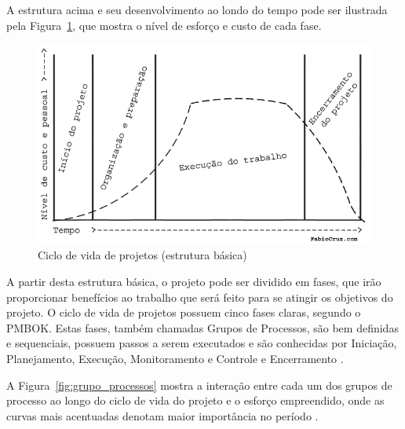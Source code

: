\documentclass[
    12pt,               %
    openright,          %
    twoside,            %
    a4paper,            %
    chapter=TITLE,     %
    english,            %
    spanish,            %
    portuguese              %
    ]{abntex2}
\begin{document}
A estrutura acima e seu desenvolvimento ao londo do tempo pode ser ilustrada pela Figura~\ref{fig:ciclo_vida_projeto}, que mostra o nível de esforço e custo de cada fase.

\begin{figure}[htb]
\RawFloats
	\caption{\label{fig:ciclo_vida_projeto}Ciclo de vida de projetos (estrutura básica)}
	\begin{center}
	    \includegraphics[scale=0.50]{figuras/ciclo_vida_projeto.png}
	\end{center}
\end{figure}

A partir desta estrutura básica, o projeto pode ser dividido em fases, que irão proporcionar benefícios ao trabalho que será feito para se atingir os objetivos do projeto. O ciclo de vida de projetos possuem cinco fases claras, segundo o PMBOK. Estas fases, também chamadas Grupos de Processos, são bem definidas e sequenciais, possuem passos a serem executados e são conhecidas por Iniciação, Planejamento, Execução, Monitoramento e Controle e Encerramento \cite[p.~14]{Cruz2013}. 

A Figura~\ref{fig:grupo_processos} mostra a interação entre cada um dos grupos de processo ao longo do ciclo de vida do projeto e o esforço empreendido, onde as curvas mais acentuadas denotam maior importância no período \cite[p.~15]{Rafael2012}. 
\end{document}
